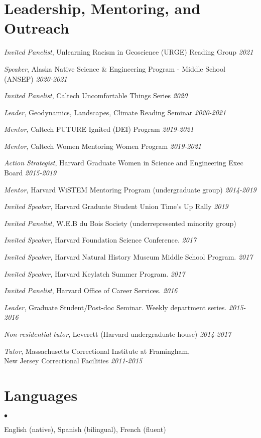 \documentclass[margin,line]{res}
\newenvironment{list1}{
  \begin{list}{\ding{113}}{%
      \setlength{\itemsep}{0in}
      \setlength{\parsep}{0in} \setlength{\parskip}{0in}
      \setlength{\topsep}{0in} \setlength{\partopsep}{0in} 
      \setlength{\leftmargin}{0.00in}}}{\end{list}}
\newenvironment{list2}{
  \begin{list}{$\bullet$}{%
      \setlength{\itemsep}{0in}
      \setlength{\parsep}{0in} \setlength{\parskip}{0in}
      \setlength{\topsep}{0in} \setlength{\partopsep}{0in} 
      \setlength{\leftmargin}{0.00in}}}{\end{list}}
\begin{document}
\begin{resume}
\section{\sc Leadership, Mentoring, and Outreach } 
\begin{list1}
\item[] {\em Invited Panelist}, Unlearning Racism in Geoscience (URGE) Reading Group \hfill{\em 2021}
\item[] {\em Speaker}, Alaska Native Science \& Engineering Program - Middle School (ANSEP) \hfill{\em 2020-2021}
\item[] {\em Invited Panelist}, Caltech Uncomfortable Things Series \hfill{\em 2020}
\item[] {\em Leader}, Geodynamics, Landscapes, Climate Reading Seminar \hfill{\em 2020-2021}
\item[] {\em Mentor}, Caltech FUTURE Ignited (DEI) Program \hfill{\em 2019-2021}
\item[] {\em Mentor}, Caltech Women Mentoring Women Program \hfill{\em 2019-2021}
\item[] {\em Action Strategist}, Harvard Graduate Women in Science and Engineering Exec Board \hfill{\em 2015-2019}
\item[] {\em Mentor}, Harvard WiSTEM Mentoring Program (undergraduate group) \hfill{\em 2014-2019}
\item[] {\em Invited Speaker}, Harvard Graduate Student Union Time's Up Rally \hfill{\em 2019}
\item[] {\em Invited Panelist}, W.E.B du Bois Society (underrepresented minority group)
\item[] {\em Invited Speaker}, Harvard Foundation Science Conference. \hfill {\em 2017}
\item[] {\em Invited Speaker}, Harvard Natural History Museum Middle School Program. \hfill {\em 2017}
\item[] {\em Invited Speaker}, Harvard Keylatch Summer Program. \hfill {\em 2017}
\item[] {\em Invited Panelist}, Harvard Office of Career Services. \hfill {\em 2016}
\item[] {\em Leader}, Graduate Student/Post-doc Seminar. Weekly department series. \hfill {\em 2015-2016}
\item[] {\em Non-residential tutor}, Leverett (Harvard undergraduate house)  \hfill {\em 2014-2017}
\item[] {\em Tutor}, Massachusetts Correctional Institute at Framingham, \\ New Jersey Correctional Facilities \hfill {\em 2011-2015} 
\end{list1}

\section{\sc Languages} 
\begin{list2}
\item[] English {(native)}, Spanish {(bilingual)}, French {(fluent)}
\item[] 
\end{list2}

\end{resume}
\end{document}
